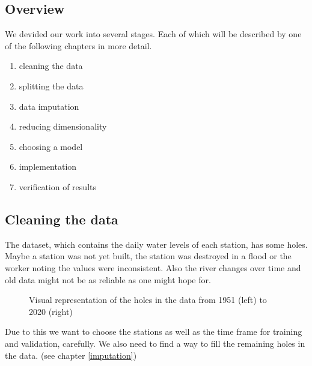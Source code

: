 \documentclass{article}
\newenvironment{enumeratenumeric}{\begin{enumerate}[1.] }{\end{enumerate}}
\begin{document}
\subsection{Overview}

We devided our work into several stages. Each of which will be described by
one of the following chapters in more detail.
\begin{enumeratenumeric}
  \item cleaning the data
  
  \item splitting the data
  
  \item data imputation
  
  \item reducing dimensionality
  
  \item choosing a model
  
  \item implementation
  
  \item verification of results
\end{enumeratenumeric}
\subsection{Cleaning the data}\label{clean}

The dataset, which contains the daily water levels of each station, has some
holes. Maybe a station was not yet built, the station was destroyed in a
flood or the worker noting the values were inconsistent. Also the river changes over
time and old data might not be as reliable as one might hope for.

\begin{figure}[h]
  \caption{Visual representation of the holes in the data from 1951 (left) to
  2020 (right)}
\end{figure}

Due to this we want to choose the stations as well as the time frame for training and validation, carefully. We also need to find a way to
fill the remaining holes in the data. (see chapter \ref{imputation})
\end{document}
